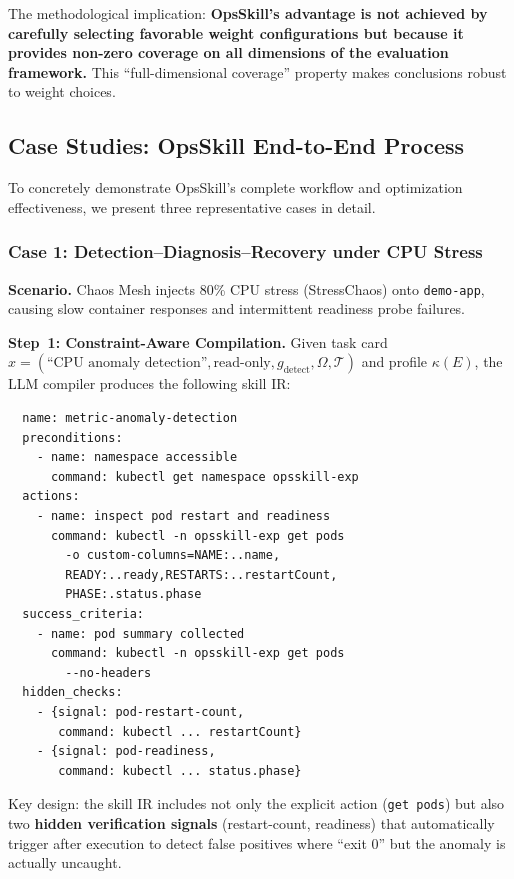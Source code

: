 \documentclass[conference,10pt]{IEEEtran}
\begin{document}
The methodological implication: \textbf{OpsSkill's advantage is not achieved by carefully selecting favorable weight configurations but because it provides non-zero coverage on all dimensions of the evaluation framework.}
This ``full-dimensional coverage'' property makes conclusions robust to weight choices.

\subsection{Case Studies: OpsSkill End-to-End Process}

To concretely demonstrate OpsSkill's complete workflow and optimization effectiveness, we present three representative cases in detail.

\subsubsection{Case 1: Detection--Diagnosis--Recovery under CPU Stress}

\textbf{Scenario.}
Chaos Mesh injects 80\% CPU stress (StressChaos) onto \texttt{demo-app}, causing slow container responses and intermittent readiness probe failures.

\textbf{Step~1: Constraint-Aware Compilation.}
Given task card $x=(\text{``CPU anomaly detection''}, \text{read-only}, g_{\text{detect}}, \Omega, \mathcal{T})$ and profile $\kappa(E)$, the LLM compiler produces the following skill IR:

{\footnotesize
\begin{verbatim}
  name: metric-anomaly-detection
  preconditions:
    - name: namespace accessible
      command: kubectl get namespace opsskill-exp
  actions:
    - name: inspect pod restart and readiness
      command: kubectl -n opsskill-exp get pods
        -o custom-columns=NAME:..name,
        READY:..ready,RESTARTS:..restartCount,
        PHASE:.status.phase
  success_criteria:
    - name: pod summary collected
      command: kubectl -n opsskill-exp get pods
        --no-headers
  hidden_checks:
    - {signal: pod-restart-count,
       command: kubectl ... restartCount}
    - {signal: pod-readiness,
       command: kubectl ... status.phase}
\end{verbatim}
}

\noindent Key design: the skill IR includes not only the explicit action (\texttt{get pods}) but also two \textbf{hidden verification signals} (restart-count, readiness) that automatically trigger after execution to detect false positives where ``exit 0'' but the anomaly is actually uncaught.
\end{document}
